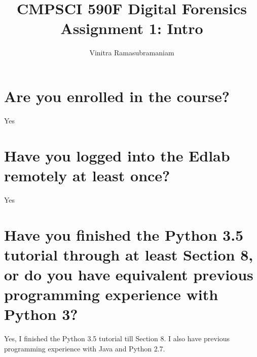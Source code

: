 \documentclass[11pt]{article}
\title{\vspace{-2cm}CMPSCI 590F Digital Forensics Assignment 1: Intro}
\author{Vinitra Ramasubramaniam}
\numberwithin{equation}{subsection}
\begin{document}
\maketitle
\section{Are you enrolled in the course?}
Yes
\section{Have you logged into the Edlab remotely at least once?}
Yes
\section{Have you finished the Python 3.5 tutorial through at least Section 8, or do you have equivalent previous programming experience with Python 3?}
Yes, I finished the Python 3.5 tutorial till Section 8. I also have previous programming experience with Java and Python 2.7.
\end{document}
